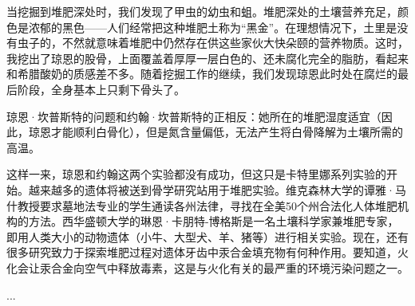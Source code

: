 \documentclass[12pt,oneside]{book}
\begin{document}
\begin{bookref}[frametitle={\cite{好好告别：世界葬礼观察手记}}]
当挖掘到堆肥深处时，我们发现了甲虫的幼虫和蛆。堆肥深处的土壤营养充足，颜色是浓郁的黑色——人们经常把这种堆肥土称为“黑金”。在理想情况下，土里是没有虫子的，不然就意味着堆肥中仍然存在供这些家伙大快朵颐的营养物质。这时，我挖出了琼恩的股骨，上面覆盖着厚厚一层白色的、还未腐化完全的脂肪，看起来和希腊酸奶的质感差不多。随着挖掘工作的继续，我们发现琼恩此时处在腐烂的最后阶段，全身基本上只剩下骨头了。

琼恩·坎普斯特的问题和约翰·坎普斯特的正相反：她所在的堆肥湿度适宜（因此，琼恩才能顺利白骨化），但是氮含量偏低，无法产生将白骨降解为土壤所需的高温。

这样一来，琼恩和约翰这两个实验都没有成功，但这只是卡特里娜系列实验的开始。越来越多的遗体将被送到骨学研究站用于堆肥实验。维克森林大学的谭雅·马什教授要求墓地法专业的学生通读各州法律，寻找在全美50个州合法化人体堆肥机构的方法。西华盛顿大学的琳恩·卡朋特-博格斯是一名土壤科学家兼堆肥专家，即用人类大小的动物遗体（小牛、大型犬、羊、猪等）进行相关实验。现在，还有很多研究致力于探索堆肥过程对遗体牙齿中汞合金填充物有何种作用。要知道，火化会让汞合金向空气中释放毒素，这是与火化有关的最严重的环境污染问题之一。

...

\end{bookref}
\end{document}
